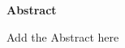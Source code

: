 \thispagestyle{empty}
\begin{center}
    \large

    \vspace{0.9cm}
    \textbf{Abstract}
\end{center}
Add the Abstract here